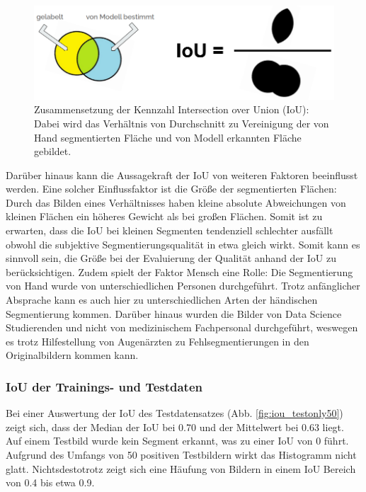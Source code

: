 \begin{figure}[H]
\centering
\includegraphics[width=\textwidth]{./pic/Segmentierung/iou.png}
\caption{\label{fig:iou}Zusammensetzung der Kennzahl Intersection over Union (IoU): Dabei wird das Verhältnis von Durchschnitt zu Vereinigung der von Hand segmentierten Fläche und von Modell erkannten Fläche gebildet.}
\end{figure}

Darüber hinaus kann die Aussagekraft der IoU von weiteren Faktoren beeinflusst werden. Eine solcher Einflussfaktor ist die Größe der segmentierten Flächen: Durch das Bilden eines Verhältnisses haben kleine absolute Abweichungen von kleinen Flächen ein höheres Gewicht als bei großen Flächen. Somit ist zu erwarten, dass die IoU bei kleinen Segmenten tendenziell schlechter ausfällt obwohl die subjektive Segmentierungsqualität in etwa gleich wirkt. Somit kann es sinnvoll sein, die Größe bei der Evaluierung der Qualität anhand der IoU zu berücksichtigen. Zudem spielt der Faktor Mensch eine Rolle: Die Segmentierung von Hand wurde von unterschiedlichen Personen durchgeführt. Trotz anfänglicher Absprache kann es auch hier zu unterschiedlichen Arten der händischen Segmentierung kommen. Darüber hinaus wurden die Bilder von Data Science Studierenden und nicht von medizinischem Fachpersonal durchgeführt, weswegen es trotz Hilfestellung von Augenärzten zu Fehlsegmentierungen in den Originalbildern kommen kann.


\subsubsection{IoU der Trainings- und Testdaten}

Bei einer Auswertung der IoU des Testdatensatzes (Abb. \ref{fig:iou_testonly50}) zeigt sich, dass der Median der IoU bei 0.70 und der Mittelwert bei 0.63 liegt.\newline
Auf einem Testbild wurde kein Segment erkannt, was zu einer IoU von 0 führt.
Aufgrund des Umfangs von 50 positiven Testbildern wirkt das Histogramm nicht glatt. Nichtsdestotrotz zeigt sich eine Häufung von Bildern in einem IoU Bereich von 0.4 bis etwa 0.9.

